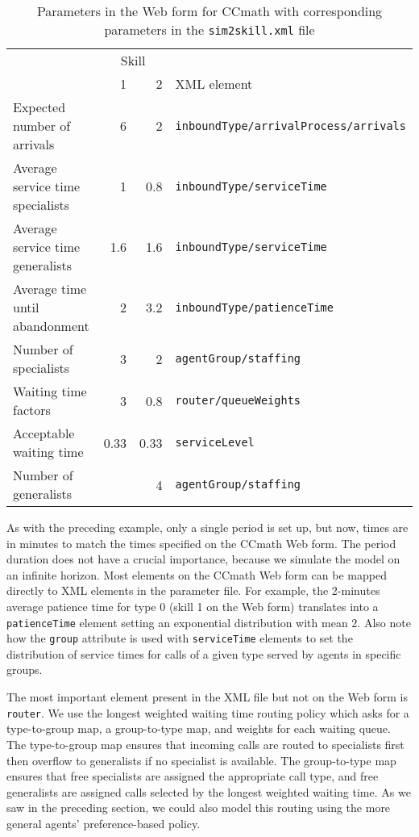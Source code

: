 \begin{table}
\caption{Parameters in the Web form for CCmath with corresponding
  parameters in the \texttt{sim2skill.xml} file}
\label{tab:sim2skillccmath}
\begin{center}
\begin{tabular}{|l|rr|l|}\cline{2-3}
\multicolumn{1}{l}{}&\multicolumn{2}{|c|}{Skill}&\multicolumn{1}{l}{}\\
\cline{2-4}
\multicolumn{1}{l|}{}&1&2&XML element\\ \hline
Expected number of arrivals&6&2&\texttt{inboundType/arrivalProcess/arrivals}\\
Average service time specialists&1&0.8&\texttt{inboundType/serviceTime}\\
Average service time generalists&1.6&1.6&\texttt{inboundType/serviceTime}\\
Average time until abandonment&2&3.2&\texttt{inboundType/patienceTime}\\
Number of specialists&3&2&\texttt{agentGroup/staffing}\\
Waiting time factors&3&0.8&\texttt{router/queueWeights}\\
Acceptable waiting time&0.33&0.33&\texttt{serviceLevel}\\
Number of generalists&\multicolumn{2}{|r|}{4}&\texttt{agentGroup/staffing}\\
\hline
\end{tabular}
\end{center}
\end{table}

As with the preceding example, only a single period is set up, but
now, times are in minutes to match the times specified on the CCmath
Web form.  The period duration does not have a crucial importance,
because we simulate the model on an infinite horizon.
Most elements on the CCmath Web form can be mapped directly to XML
elements in the parameter file.
For example, the 2-minutes average patience
time for type 0 (skill 1 on the Web form) translates into a
\texttt{patienceTime} element
setting an exponential distribution with mean $2$.
Also note how the \texttt{group} attribute is used with
\texttt{service\-Time} elements to set the distribution of service
times for calls of a given type served by agents in specific groups.

The most important element present in the XML file but not on the Web form is
\texttt{router}.  We use the longest weighted waiting time routing policy
which asks for a type-to-group map, a group-to-type map, and weights
for each waiting queue.  The type-to-group map ensures that incoming
calls are routed to specialists first then overflow to generalists if
no specialist is available.  The group-to-type map ensures that free
specialists are assigned the appropriate call type, and free
generalists are assigned calls selected by the longest weighted
waiting time.
As we saw in the preceding section, we could also model this routing
using the more general agents' preference-based policy.

